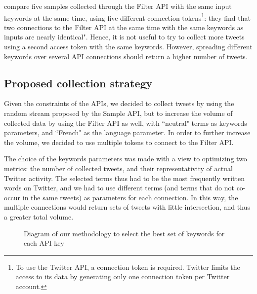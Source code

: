 \citet{joseph_two_2014} compare five samples collected through the Filter API with the same input keywords at the same time, using five different connection tokens\footnote{To use the Twitter API, a connection token is required. Twitter limits the access to its data by generating only one connection token per Twitter account.}: they find that two connections to the Filter API at the same time with the same keywords as inputs are nearly identical". Hence, it is not useful to try to collect more tweets using a second access token with the same keywords. However, spreading different keywords over several API connections should return a higher number of tweets.

\subsection{Proposed collection strategy \label{Subsec: collection strategy}}

Given the constraints of the APIs, we decided to collect tweets by using the random stream proposed by the Sample API, but to increase the volume of collected data by using the Filter API as well, with ``neutral" terms as keywords parameters, and ``French" as the language parameter.  In order to further increase the volume, we decided to use multiple tokens to connect to the Filter API. 



The choice of the keywords parameters was made with a view to optimizing two metrics: the number of collected tweets, and their representativity of actual Twitter activity. The selected terms thus had to be the most frequently written words on Twitter, and we had to use different terms (and terms that do not co-occur in the same tweets) as parameters for each connection. In this way, the multiple connections would return sets of tweets with little intersection, and thus a greater total volume.


\begin{figure}
\caption{Diagram of our methodology to select the best set of keywords for each API key}
\label{Figure:ExperimentalSetup}
\end{figure}

